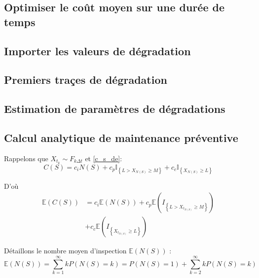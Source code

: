 \documentclass[10pt,a4paper]{article}
\begin{document}
\subsection{Optimiser le coût moyen sur une durée de temps}
\label{annexe:optim_e_c}

\subsection{Importer les valeurs de dégradation}
\label{annexe:import_degrad}

\subsection{Premiers traçes de dégradation}
\label{annexe:premier_plot_degrad}

\subsection{Estimation de paramètres de dégradations}
\label{annexe:estim_degrad}

\subsection{Calcul analytique de maintenance préventive}
\label{annexe:ana_e_c}
Rappelons que ${X_{{t_k}}} \sim {F_{k\Delta t}}$ et \eqref{c_s_de}:
\[C\left( S \right) = {c_i}N\left( S \right) + {c_p}{\mathbb{I}_{\left\{ {L > {X_{N\left( S \right)}} \geqslant M} \right\}}} + {c_c}{\mathbb{I}_{\left\{ {{X_{N\left( S \right)}} \geqslant L} \right\}}}\]

D'où
\begin{align*}
    \label{e_c_s_de}
    \mathbb{E}\left( {C\left( S \right)} \right) & = {c_i}\mathbb{E}\left( {N\left( S \right)} \right) + {c_p}\mathbb{E}\left( {{I_{\left\{ {L > {X_{{t_{N\left( S \right)}}}} \geqslant M} \right\}}}} \right) \\
    & + {c_c}\mathbb{E}\left( {{I_{\left\{ {{X_{{t_{N\left( S \right)}}}} \geqslant L} \right\}}}} \right)
\end{align*}

Détaillons le nombre moyen d'inspection $\mathbb{E}\left( {N\left( S \right)} \right)$ :
\[\mathbb{E}\left( {N\left( S \right)} \right) = \sum\limits_{k = 1}^\infty  {kP\left( {N\left( S \right) = k} \right)}  = P\left( {N\left( S \right) = 1} \right) + \sum\limits_{k = 2}^\infty  {kP\left( {N\left( S \right) = k} \right)} \]
\end{document}
